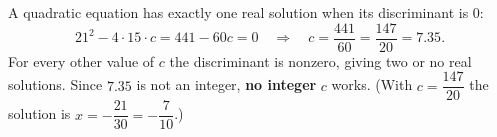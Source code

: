 A quadratic equation has exactly one real solution when its discriminant is $0$:
\[21^2-4\cdot15\cdot c=441-60c=0\quad\Longrightarrow\quad c=\dfrac{441}{60}=\boxed{\dfrac{147}{20}}=7.35.\]
For every other value of $c$ the discriminant is nonzero, giving two or no real solutions. Since $7.35$ is not an integer, \textbf{no integer} $c$ works. (With $c=\dfrac{147}{20}$ the solution is $x=-\dfrac{21}{30}=-\dfrac{7}{10}$.)
